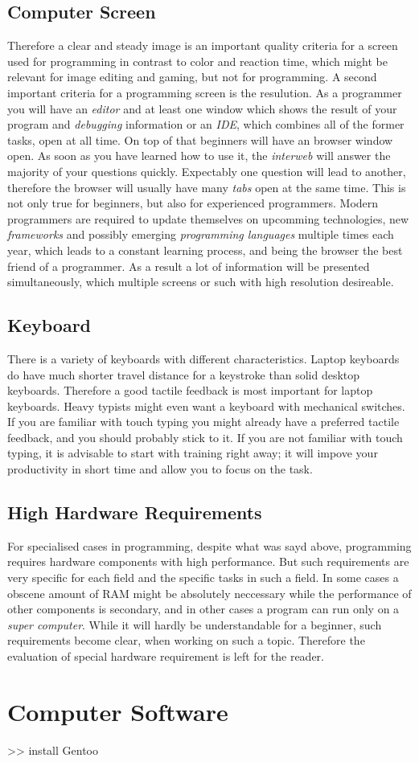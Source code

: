 \documentclass[a4paper,10pt]{scrbook}
\begin{document}
\subsection{Computer Screen}
Therefore a clear and steady image is an important quality criteria for a screen used for programming in contrast to color and reaction time, which might be relevant for image editing and gaming, but not for programming.
A second important criteria for a programming screen is the resulution.
As a programmer you will have an \emph{editor} and at least one window which shows the result of your program and \emph{debugging} information or an \emph{IDE}, which combines all of the former tasks, open at all time.
On top of that beginners will have an browser window open.
As soon as you have learned how to use it, the \emph{interweb} will answer the majority of your questions quickly.
Expectably one question will lead to another, therefore the browser will usually have many \emph{tabs} open at the same time.
This is not only true for beginners, but also for experienced programmers.
Modern programmers are required to update themselves on upcomming technologies, new \emph{frameworks} and possibly emerging \emph{programming languages} multiple times each year, which leads to a constant learning
process, and being the browser the best friend of a programmer.
As a result a lot of information will be presented simultaneously, which multiple screens or such with high resolution desireable.

\subsection{Keyboard}
There is a variety of keyboards with different characteristics. Laptop keyboards do have much shorter travel distance for a keystroke than solid desktop keyboards.
Therefore a good tactile feedback is most important for laptop keyboards.
Heavy typists might even want a keyboard with mechanical switches.
If you are familiar with touch typing you might already have a preferred tactile feedback, and you should probably stick to it.
If you are not familiar with touch typing, it is advisable to start with training right away;
it will impove your productivity in short time and allow you to focus on the task.

\subsection{High Hardware Requirements}
For specialised cases in programming, despite what was sayd above, programming requires hardware components with high performance.
But such requirements are very specific for each field and the specific tasks in such a field.
In some cases a obscene amount of RAM might be absolutely neccessary while the performance of other components is secondary, and in other cases a program can run only on a \emph{super computer}.
While it will hardly be understandable for a beginner, such requirements become clear, when working on such a topic.
Therefore the evaluation of special hardware requirement is left for the reader.

\section{Computer Software}

>> install Gentoo
\end{document}
